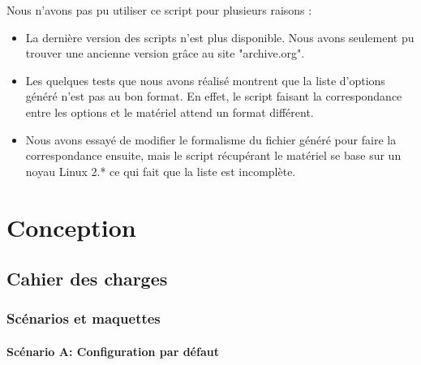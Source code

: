 \documentclass[16pts]{report}
\begin{document}
    Nous n'avons pas pu utiliser ce script pour plusieurs raisons :
    \begin{itemize}
        \item La dernière version des scripts n'est plus disponible. Nous avons
            seulement pu trouver une ancienne version grâce au site
            "archive.org".
        \item Les quelques tests que nous avons réalisé montrent que la liste
            d'options généré n'est pas au bon format. En effet, le script
            faisant la correspondance entre les options et le matériel attend
            un format différent.
        \item Nous avons essayé de modifier le formalisme du fichier généré
            pour faire la correspondance ensuite, mais le script récupérant le
            matériel se base sur un noyau Linux 2.* ce qui fait que la liste
            est incomplète.
    \end{itemize}

\chapter{Conception}
\label{cha:Conception}
    \section{Cahier des charges}
    \label{sec:Cahier des charges}
        \subsection{Scénarios et maquettes}
        \label{sub:Scénarios et maquettes}

\subsubsection{Scénario A: Configuration par défaut}
\label{sssub:Scénario A: Configuration par défaut}
\end{document}
